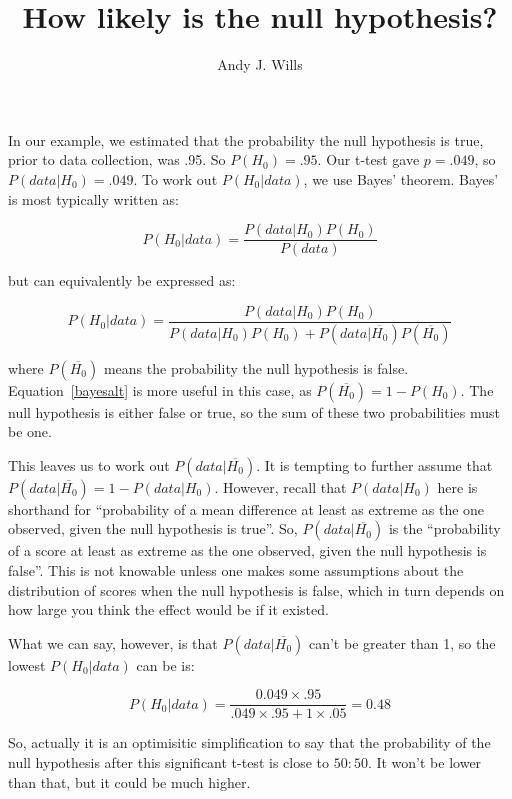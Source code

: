 \documentclass{article}
\title{How likely is the null hypothesis?}
\author{Andy J. Wills}
\begin{document}
\maketitle

In our example, we estimated that the probability the null hypothesis
is true, prior to data collection, was .95. So $P(H_0) = .95$. Our t-test gave
$p = .049$, so $P(data|H_0) = .049$. To work out $P(H_0|data)$, we use Bayes'
theorem. Bayes' is most typically written as:

\begin{equation}
  P(H_0 | data) = \frac{P(data | H_0) P(H_0)} {P(data)}
  \label{bayes}
\end{equation}

but can equivalently be expressed as:

\begin{equation}
 P(H_0 | data) = \frac{P(data | H_0) P(H_0)} {P(data | H_0) P(H_0) +
   P(data | \overline{H_0}) P(\overline{H_0})}
 \label{bayesalt}
\end{equation}

where $P(\overline{H_0})$ means the probability the null hypothesis is
false. Equation~\ref{bayesalt} is more useful in this case, as
$P(\overline{H_0}) = 1 - P(H_0)$. The null hypothesis is either false or true,
so the sum of these two probabilities must be one.

This leaves us to work out $P(data | \overline{H_0})$. It is tempting to
further assume that $P(data | \overline{H_0}) = 1 - P(data | H_0)$. However,
recall that $P(data|H_0)$ here is shorthand for ``probability of a mean
difference at least as extreme as the one observed, given the null hypothesis
is true''. So, $P(data|\overline{H_0})$ is the ``probability of a score at
least as extreme as the one observed, given the null hypothesis is
false''. This is not knowable unless one makes some assumptions about the
distribution of scores when the null hypothesis is false, which in turn depends
on how large you think the effect would be if it existed.

What we can say, however, is that $P(data|\overline{H_0})$ can't be greater than
1, so the lowest $P(H_0 | data)$ can be is:

\begin{equation}
P(H_0 | data) =
\frac{0.049 \times .95}
{.049 \times .95 + 1 \times .05} = 0.48
\label{bayeseg}
\end{equation}

So, actually it is an optimisitic simplification to say that the probability of
the null hypothesis after this significant t-test is close to $50:50$. It won't
be lower than that, but it could be much higher.
\end{document}
